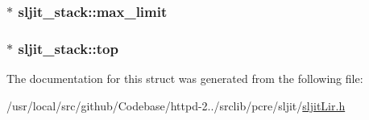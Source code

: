 \subsubsection[{\texorpdfstring{max\+\_\+limit}{max_limit}}]{$\ast$ sljit\+\_\+stack\+::max\+\_\+limit}\hypertarget{structsljit__stack_aa1676902c490e26bc4f9d545cba7940b}{}\label{structsljit__stack_aa1676902c490e26bc4f9d545cba7940b}
\subsubsection[{\texorpdfstring{top}{top}}]{$\ast$ sljit\+\_\+stack\+::top}\hypertarget{structsljit__stack_ae1b34e23f0145d03485439289cbe6da1}{}\label{structsljit__stack_ae1b34e23f0145d03485439289cbe6da1}


The documentation for this struct was generated from the following file\+:\begin{DoxyCompactItemize}
\item 
/usr/local/src/github/\+Codebase/httpd-\/2../srclib/pcre/sljit/\hyperlink{sljitLir_8h}{sljit\+Lir.\+h}\end{DoxyCompactItemize}
